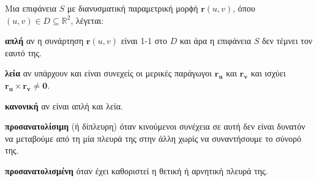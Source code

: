 




\everymath{\displaystyle}
\pagestyle{askhseis}




\setcounter{chapter}{1}

\begin{center}
\minibox{\large \bfseries \textcolor{Col1}{Επιφάνειες}}
\end{center}

\vspace{\baselineskip}



\begin{dfn}
  Μια επιφάνεια $S$ με διανυσματική παραμετρική μορϕή $ \mathbf{r}(u,v) $, όπου 
  $ (u,v) \in D \subseteq \mathbb{R}^{2} $, λέγεται:
  \begin{myitemize}
    \item \textbf{απλή} αν η συνάρτηση $ \mathbf{r}(u,v) $ είναι 1-1 στο $D$ και άρα
      η επιφάνεια $S$ δεν τέμνει τον εαυτό της.
    \item \textbf{λεία} αν υπάρχουν και είναι συνεχείς οι μερικές παράγωγοι 
      $ \mathbf{r_{u}}$ και $ \mathbf{r_{v}} $ και ισχύει 
      $ \mathbf{r_{u}} \times \mathbf{r_{v}} \neq \mathbf{0} $.
    \item \textbf{κανονική} αν είναι απλή και λεία. 
    \item \textbf{προσανατολίσιμη} (ή δίπλευρη) όταν κινούμενοι συνέχεια σε αυτή δεν 
      είναι δυνατόν να μεταβούμε από τη μία πλευρά της στην άλλη χωρίς να συναντήσουμε 
      το σύνορό της.
    \item \textbf{προσανατολισμένη} όταν έχει καθοριστεί η θετική ή αρνητική πλευρά της.
  \end{myitemize}
\end{dfn}


